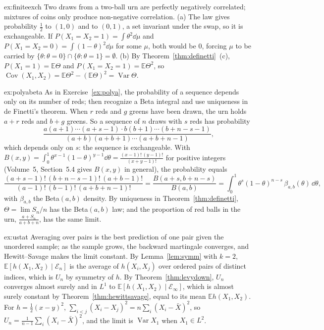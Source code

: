\begin{solution}{ex:finiteexch}
\idea Two draws from a two-ball urn are perfectly negatively correlated; mixtures of coins only produce non-negative correlation.
\writeup (a) The law gives probability $\frac12$ to $(1,0)$ and to $(0,1)$, a set invariant under the swap, so it is exchangeable. If $P(X_1=X_2=1)=\int\theta^2\dd\mu$ and $P(X_1=X_2=0)=\int(1-\theta)^2\dd\mu$ for some $\mu$,
both would be $0$, forcing $\mu$ to be carried by $\{\theta:\theta=0\}\cap\{\theta:\theta=1\}=\emptyset$. (b) By Theorem~\ref{thm:definetti}~(c), $P(X_1=1)=\mathbb E\Theta$ and $P(X_1=X_2=1)=\mathbb E\Theta^2$, so
$\operatorname{Cov}(X_1,X_2)=\mathbb E\Theta^2-(\mathbb E\Theta)^2=\operatorname{Var}\Theta$.
\end{solution}

\begin{solution}{ex:polyabeta}
\idea As in Exercise~\ref{ex:polya}, the probability of a sequence depends only on its number of reds; then recognize a Beta integral and use uniqueness in de Finetti's theorem.
\writeup When $r$ reds and $g$ greens have been drawn, the urn holds $a+r$ reds and $b+g$ greens. So a sequence of $n$ draws with $s$ reds has probability
\[
\frac{a(a+1)\cdots(a+s-1)\cdot b(b+1)\cdots(b+n-s-1)}{(a+b)(a+b+1)\cdots(a+b+n-1)},
\]
which depends only on $s$: the sequence is exchangeable. With $B(x,y)=\int_0^1\theta^{x-1}(1-\theta)^{y-1}\dd\theta=\frac{(x-1)!\,(y-1)!}{(x+y-1)!}$ for positive integers (Volume~5, Section~5.4 gives $B(x,y)$ in general), the probability equals
\[
\frac{(a+s-1)!\,(b+n-s-1)!\,(a+b-1)!}{(a-1)!\,(b-1)!\,(a+b+n-1)!}=\frac{B(a+s,b+n-s)}{B(a,b)}=\int_0^1\theta^s(1-\theta)^{n-s}\,\beta_{a,b}(\theta)\,\dd\theta,
\]
with $\beta_{a,b}$ the Beta$(a,b)$ density. By uniqueness in Theorem~\ref{thm:definetti}, $\Theta=\lim S_n/n$ has the Beta$(a,b)$ law; and the proportion of red balls in the urn, $\frac{a+S_n}{a+b+n}$, has the same limit.
\end{solution}

\begin{solution}{ex:ustat}
\idea Averaging over pairs is the best prediction of one pair given the unordered sample; as the sample grows, the backward martingale converges, and Hewitt--Savage makes the limit constant.
\writeup By Lemma~\ref{lem:symm} with $k=2$, $\mathbb E[h(X_1,X_2)\mid\mathcal E_n]$ is the average of $h(X_i,X_j)$ over ordered pairs of distinct indices, which is $U_n$ by symmetry of $h$. By Theorem~\ref{thm:levydown}, $U_n$
converges almost surely and in $L^1$ to $\mathbb E[h(X_1,X_2)\mid\mathcal E_\infty]$, which is almost surely constant by Theorem~\ref{thm:hewittsavage}, equal to its mean $\mathbb Eh(X_1,X_2)$. For
$h=\frac12(x-y)^2$, $\sum_{i<j}(X_i-X_j)^2=n\sum_i(X_i-\bar X)^2$, so $U_n=\frac1{n-1}\sum_i(X_i-\bar X)^2$, and the limit is $\operatorname{Var}X_1$ when $X_1\in L^2$.
\end{solution}

